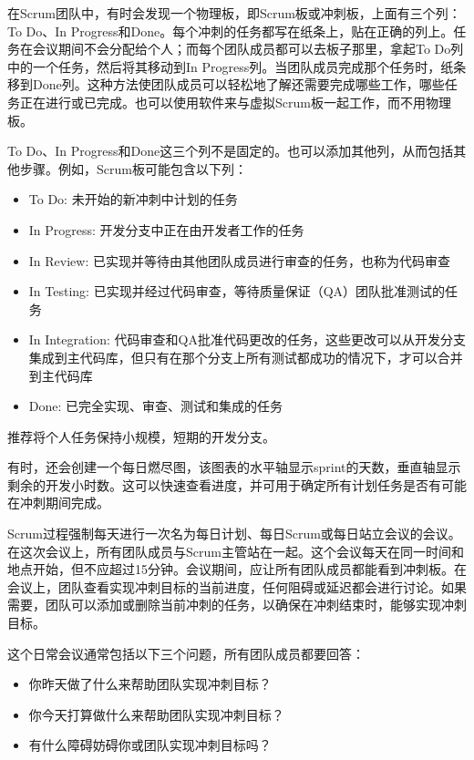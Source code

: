 在Scrum团队中，有时会发现一个物理板，即Scrum板或冲刺板，上面有三个列：To Do、In Progress和Done。每个冲刺的任务都写在纸条上，贴在正确的列上。任务在会议期间不会分配给个人；而每个团队成员都可以去板子那里，拿起To Do列中的一个任务，然后将其移动到In Progress列。当团队成员完成那个任务时，纸条移到Done列。这种方法使团队成员可以轻松地了解还需要完成哪些工作，哪些任务正在进行或已完成。也可以使用软件来与虚拟Scrum板一起工作，而不用物理板。

To Do、In Progress和Done这三个列不是固定的。也可以添加其他列，从而包括其他步骤。例如，Scrum板可能包含以下列：

\begin{itemize}
\item
To Do: 未开始的新冲刺中计划的任务

\item
In Progress: 开发分支中正在由开发者工作的任务

\item
In Review: 已实现并等待由其他团队成员进行审查的任务，也称为代码审查

\item
In Testing: 已实现并经过代码审查，等待质量保证（QA）团队批准测试的任务

\item
In Integration: 代码审查和QA批准代码更改的任务，这些更改可以从开发分支集成到主代码库，但只有在那个分支上所有测试都成功的情况下，才可以合并到主代码库

\item
Done: 已完全实现、审查、测试和集成的任务
\end{itemize}

推荐将个人任务保持小规模，短期的开发分支。

有时，还会创建一个每日燃尽图，该图表的水平轴显示sprint的天数，垂直轴显示剩余的开发小时数。这可以快速查看进度，并可用于确定所有计划任务是否有可能在冲刺期间完成。

Scrum过程强制每天进行一次名为每日计划、每日Scrum或每日站立会议的会议。在这次会议上，所有团队成员与Scrum主管站在一起。这个会议每天在同一时间和地点开始，但不应超过15分钟。会议期间，应让所有团队成员都能看到冲刺板。在会议上，团队查看实现冲刺目标的当前进度，任何阻碍或延迟都会进行讨论。如果需要，团队可以添加或删除当前冲刺的任务，以确保在冲刺结束时，能够实现冲刺目标。

这个日常会议通常包括以下三个问题，所有团队成员都要回答：

\begin{itemize}
\item
你昨天做了什么来帮助团队实现冲刺目标？

\item
你今天打算做什么来帮助团队实现冲刺目标？

\item
有什么障碍妨碍你或团队实现冲刺目标吗？
\end{itemize}

